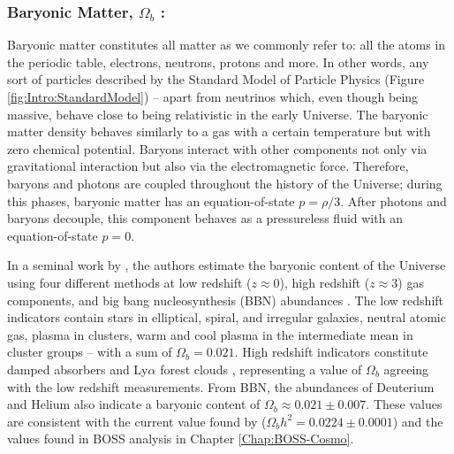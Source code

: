 \subsubsection{Baryonic Matter, $\Omega_b$ :}
Baryonic matter constitutes all matter as we commonly refer to: all the atoms in the periodic table, electrons, neutrons, protons and more. In other words, any sort of particles described by the Standard Model of Particle Physics (Figure \ref{fig:Intro:StandardModel}) -- apart from neutrinos which, even though being massive, behave close to being relativistic in the early Universe. The baryonic matter density behaves similarly to a gas with a certain temperature but with zero chemical potential. Baryons interact with other components not only via gravitational interaction but also via the electromagnetic force. Therefore, baryons and photons are coupled throughout the history of the Universe; during this phases, baryonic matter has an equation-of-state $p = \rho/3$. After photons and baryons decouple, this component behaves as a pressureless fluid with an equation-of-state $p=0$. 

\qquad In a seminal work by \cite{1998BaryonContent}, the authors estimate the baryonic content of the Universe using four different methods at low redshift ($z \approx 0$), high redshift ($z\approx 3$) gas components, and big bang nucleosynthesis (BBN) abundances \citep{2000-BBN-Review,2016R-BBN-Review}. The low redshift indicators contain stars in elliptical, spiral, and irregular galaxies, neutral atomic gas, plasma in clusters, warm and cool plasma in the intermediate mean in cluster groups -- with a sum of $\Omega_b = 0.021$. High redshift indicators constitute damped absorbers and Ly$\alpha$ forest clouds \citep{2003Weinberg-Lyalpha}, representing a value of $\Omega_b$ agreeing with the low redshift measurements. From BBN, the abundances of Deuterium and Helium also indicate a baryonic content of $\Omega_b \approx 0.021\pm 0.007$. These values are consistent with the current value found by \cite{2018PlanckCosmology} ($\Omega_b h^2 = 0.0224 \pm 0.0001$) and the values found in BOSS analysis in Chapter \ref{Chap:BOSS-Cosmo}.

